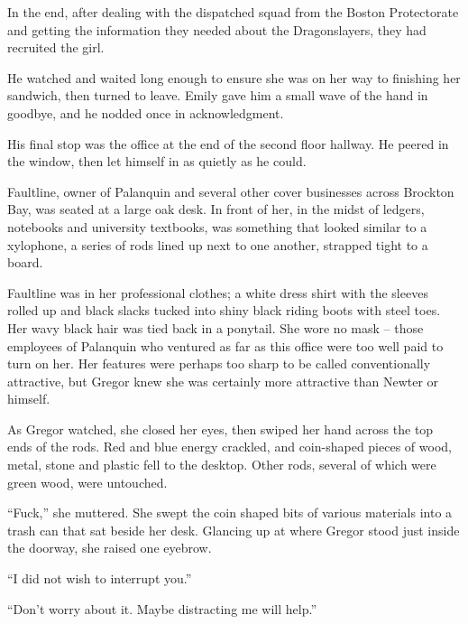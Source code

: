 In the end, after dealing with the dispatched squad from the Boston Protectorate and getting the information they needed about the Dragonslayers, they had recruited the girl.



He watched and waited long enough to ensure she was on her way to finishing her sandwich, then turned to leave.  Emily gave him a small wave of the hand in goodbye, and he nodded once in acknowledgment.



His final stop was the office at the end of the second floor hallway.  He peered in the window, then let himself in as quietly as he could.



Faultline, owner of Palanquin and several other cover businesses across Brockton Bay, was seated at a large oak desk.  In front of her, in the midst of ledgers, notebooks and university textbooks, was something that looked similar to a xylophone, a series of rods lined up next to one another, strapped tight to a board.



Faultline was in her professional clothes; a white dress shirt with the sleeves rolled up and black slacks tucked into shiny black riding boots with steel toes.  Her wavy black hair was tied back in a ponytail.  She wore no mask – those employees of Palanquin who ventured as far as this office were too well paid to turn on her.  Her features were perhaps too sharp to be called conventionally attractive, but Gregor knew she was certainly more attractive than Newter or himself.



As Gregor watched, she closed her eyes, then swiped her hand across the top ends of the rods.  Red and blue energy crackled, and coin-shaped pieces of wood, metal, stone and plastic fell to the desktop.  Other rods, several of which were green wood, were untouched.



``Fuck,'' she muttered.  She swept the coin shaped bits of various materials into a trash can that sat beside her desk.  Glancing up at where Gregor stood just inside the doorway, she raised one eyebrow.



``I did not wish to interrupt you.''



``Don't worry about it.  Maybe distracting me will help.''



